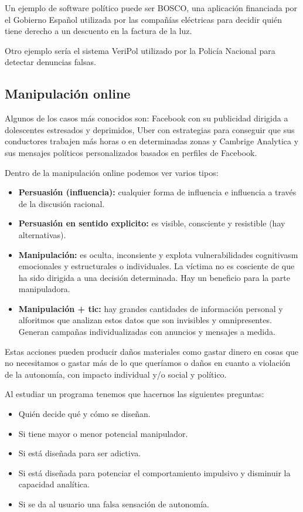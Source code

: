 Un ejemplo de software político puede ser BOSCO, una aplicación financiada por el Gobierno Español utilizada por las compañías eléctricas para decidir quién tiene derecho a un descuento en la factura de la luz.

Otro ejemplo sería el sistema VeriPol utilizado por la Policía Nacional para detectar denuncias falsas.

\subsection{Manipulación online}
Algunos de los casos más conocidos son: Facebook con su publicidad dirigida a dolescentes estresados y deprimidos, Uber con estrategias para conseguir que sus conductores trabajen más horas o en determinadas zonas y Cambrige Analytica y sus mensajes políticos personalizados basados en perfiles de Facebook.

Dentro de la manipulación online podemos ver varios tipos:
\begin{itemize}
    \item\textbf{Persuasión (influencia):} cualquier forma de influencia e influencia a través de la discusión racional.
    \item\textbf{Persuasión en sentido explicito:} es visible, consciente y resistible (hay alternativas).
    \item\textbf{Manipulación:} es oculta, inconsiente y explota vulnerabilidades cognitivasm emocionales y estructurales o individuales. La víctima no es cosciente de que ha sido dirigida a una decisión determinada. Hay un beneficio para la parte manipuladora.
    \item\textbf{Manipulación + \gls{tic}:} hay grandes cantidades de información personal y alforitmos que analizan estos datos que son invisibles y omnipresentes. Generan campañas individualizadas con anuncios y mensajes a medida.
\end{itemize}

Estas acciones pueden producir daños materiales como gastar dinero en cosas que no necesitamos o gastar más de lo que queríamos o daños en cuanto a violación de la autonomía, con impacto individual y/o social y político.

Al estudiar un programa tenemos que hacernos las siguientes preguntas:
\begin{itemize}
    \item Quién decide qué y cómo se diseñan.
    \item Si tiene  mayor o menor potencial manipulador.
    \item Si está diseñada para ser adictiva.
    \item Si está diseñada para potenciar el comportamiento impulsivo y disminuir la capacidad analítica.
    \item Si se da al usuario una falsa sensación de autonomía.
\end{itemize}

